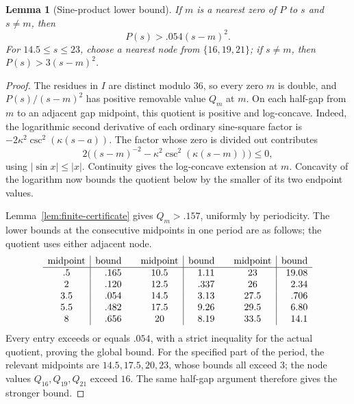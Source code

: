 \documentclass[11pt]{article}
\newtheorem{lemma}[theorem]{Lemma}
\theoremstyle{remark}\newtheorem{remark}[theorem]{Remark}
\begin{document}
\begin{lemma}[Sine-product lower bound]\label{lem:sine-barrier}
If $m$ is a nearest zero of $P$ to $s$ and $s\ne m$, then
\[
 P(s)>.054(s-m)^2.
\]
For $14.5\le s\le23$, choose a nearest node from
$\{16,19,21\}$; if $s\ne m$, then $P(s)>3(s-m)^2$.
\end{lemma}

\begin{proof}
The residues in $I$ are distinct modulo $36$, so every zero $m$
is double, and $P(s)/(s-m)^2$ has positive removable value $Q_m$
at $m$.  On each half-gap from $m$ to an adjacent gap midpoint,
this quotient is positive and log-concave.  Indeed, the logarithmic
second derivative of each ordinary sine-square factor is
$-2\kappa^2\csc^2(\kappa(s-a))$.  The factor whose zero is
divided out contributes
\[
 2\bigl((s-m)^{-2}-\kappa^2\csc^2(\kappa(s-m))\bigr)\le0,
\]
using $|\sin x|\le|x|$.  Continuity gives the log-concave extension
at $m$.  Concavity of the logarithm now bounds the quotient below
by the smaller of its two endpoint values.

Lemma~\ref{lem:finite-certificate} gives $Q_m>.157$, uniformly
by periodicity.  The lower bounds at the consecutive midpoints in
one period are as follows; the quotient uses either adjacent node.
\[
\begin{array}{c|r@{\qquad}c|r@{\qquad}c|r}
\text{midpoint}&\text{bound}&\text{midpoint}&\text{bound}&
\text{midpoint}&\text{bound}\\\hline
.5&.165&10.5&1.11&23&19.08\\
2&.120&12.5&.337&26&2.34\\
3.5&.054&14.5&3.13&27.5&.706\\
5.5&.482&17.5&9.26&29.5&6.80\\
8&.656&20&8.19&33.5&14.1
\end{array}
\]
Every entry exceeds or equals $.054$, with a strict inequality for
the actual quotient, proving the global bound.
For the specified part of the period, the relevant midpoints are
$14.5,17.5,20,23$, whose bounds all exceed $3$; the node values
$Q_{16},Q_{19},Q_{21}$ exceed $16$.  The same half-gap argument
therefore gives the stronger bound.
\end{proof}
\end{document}
